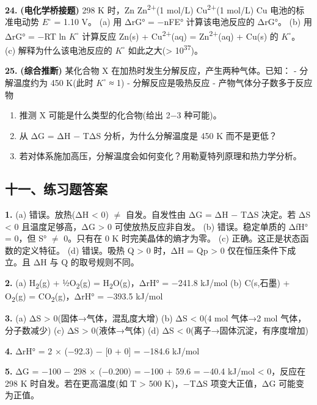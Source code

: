 \documentclass[a4paper,11pt]{ctexart}
\providecommand{\tightlist}{\setlength{\itemsep}{0pt}\setlength{\parskip}{0pt}}
\begin{document}
\textbf{24.} \textbf{(电化学桥接题)} 298 K 时，Zn \textbar{} Zn\textsuperscript{2+}(1 mol/L) \textbar\textbar{} Cu\textsuperscript{2+}(1 mol/L) \textbar{} Cu 电池的标准电动势 \(E^{\circ}\) = 1.10 V。
(a) 用 ΔrG° = −nFE° 计算该电池反应的 ΔrG°。
(b) 用 ΔrG° = −RT ln \(K^{\circ}\) 计算反应 Zn(s) + Cu\textsuperscript{2+}(aq) = Zn\textsuperscript{2+}(aq) + Cu(s) 的 \(K^{\circ}\)。
(c) 解释为什么该电池反应的 \(K^{\circ}\) 如此之大(\textgreater{} 10\textsuperscript{37})。

\textbf{25.} \textbf{(综合推断)} 某化合物 X 在加热时发生分解反应，产生两种气体。已知：
- 分解温度约为 450 K(此时 \(K^{\circ}\) ≈ 1)
- 分解反应是吸热反应
- 产物气体分子数多于反应物

\begin{enumerate}
\def\labelenumi{(\alph{enumi})}
\tightlist
\item
  推测 X 可能是什么类型的化合物(给出 2−3 种可能)。
\item
  从 ΔG = ΔH − TΔS 分析，为什么分解温度是 450 K 而不是更低？
\item
  若对体系施加高压，分解温度会如何变化？用勒夏特列原理和热力学分析。
\end{enumerate}

\subsection{十一、练习题答案}\label{ux5341ux4e00ux7ec3ux4e60ux9898ux7b54ux6848}

\textbf{1.}
(a) 错误。放热(ΔH \textless{} 0) \(\neq\) 自发。自发性由 ΔG = ΔH − TΔS 决定。若 ΔS \textless{} 0 且温度足够高，ΔG \textgreater{} 0 可使放热反应非自发。
(b) 错误。稳定单质的 ΔfH° = 0，但 S° \(\neq\) 0。只有在 0 K 时完美晶体的熵才为零。
(c) 正确。这正是状态函数的定义特征。
(d) 错误。吸热 Q \textgreater{} 0 时，ΔH = Qp \textgreater{} 0 仅在恒压条件下成立。且 ΔH 与 Q 的取号规则不同。

\textbf{2.}
(a) H\textsubscript{2}(g) + ½O\textsubscript{2}(g) = H\textsubscript{2}O(g)，ΔrH° = −241.8 kJ/mol
(b) C(s,石墨) + O\textsubscript{2}(g) = CO\textsubscript{2}(g)，ΔrH° = −393.5 kJ/mol

\textbf{3.}
(a) ΔS \textgreater{} 0(固体→气体，混乱度大增)
(b) ΔS \textless{} 0(4 mol 气体→2 mol 气体，分子数减少)
(c) ΔS \textgreater{} 0(液体→气体)
(d) ΔS \textless{} 0(离子→固体沉淀，有序度增加)

\textbf{4.} ΔrH° = 2 × (−92.3) − {[}0 + 0{]} = −184.6 kJ/mol

\textbf{5.} ΔG = −100 − 298 × (−0.200) = −100 + 59.6 = −40.4 kJ/mol \textless{} 0，反应在 298 K 时自发。若在更高温度(如 T \textgreater{} 500 K)，−TΔS 项变大正值，ΔG 可能变为正值。
\end{document}
